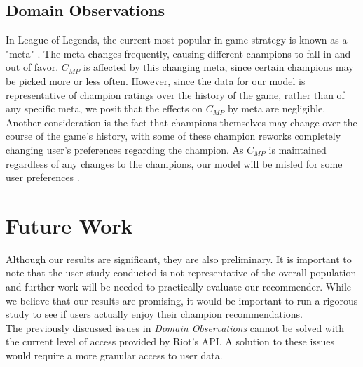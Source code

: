 \documentclass [11pt]{IEEEtran}
\begin{document}
\subsection{Domain Observations}
In League of Legends, the current most popular in-game strategy is known as a "meta" \cite{kou2014governance}. The meta changes frequently, causing different champions to fall in and out of favor.
$C_{MP}$ is affected by this changing meta, since certain champions may be picked more or less often.
However, since the data for our model is representative of champion ratings over the history of the game, rather than of any specific meta, we posit that the effects on $C_{MP}$ by meta are negligible. 
Another consideration is the fact that champions themselves may change over the course of the game's history, with some of these champion reworks completely changing user's preferences regarding the champion.
As $C_{MP}$ is maintained regardless of any changes to the champions, our model will be misled for some user preferences \cite{champUpdate}.

\section{Future Work}
Although our results are significant, they are also preliminary. It is important to note that the user study conducted is not representative of the overall population and further work will be needed to practically evaluate our recommender. 
While we believe that our results are promising, it would be important to run a rigorous study to see if  users actually enjoy their champion recommendations.
\\ \indent The previously discussed issues in \textit{Domain Observations} cannot be solved with the current level of access provided by Riot's API.
A solution to these issues would require a more granular access to user data.

\nocite{*}


\end{document}

